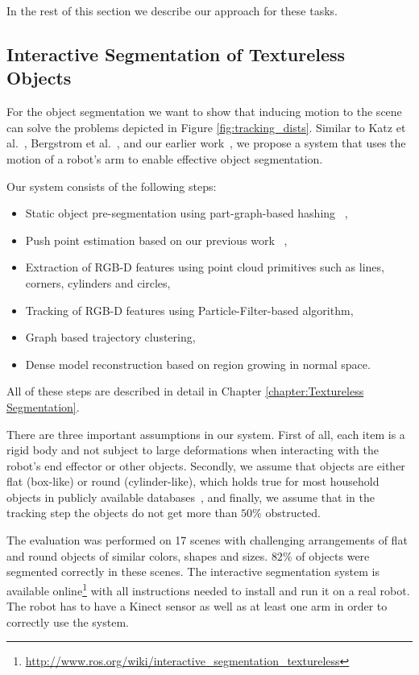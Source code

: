 In the rest of this section we describe our approach for these tasks.

\subsection{Interactive Segmentation of Textureless Objects} 


For the object segmentation 
 we want to show that inducing motion to the scene can solve the problems depicted in Figure \ref{fig:tracking_dists}. Similar  to Katz  et al.~\cite{Katz-WS-MM-ICRA2011}, Bergstrom et
al.~\cite{bergstrom11icvs}, and our earlier
work~\cite{bersch12interactive}, we propose a system that uses the
motion of a robot's arm to enable effective
object  segmentation.

Our system consists of the following steps:

\begin{itemize} 
\item Static object pre-segmentation using part-graph-based hashing ~\cite{marton12SC},
\item Push point estimation based on our previous work ~\cite{bersch12interactive},
\item Extraction of RGB-D features using point cloud primitives such as lines, corners, cylinders and circles,
\item Tracking of RGB-D features using Particle-Filter-based algorithm,
\item Graph based trajectory clustering,
\item Dense model reconstruction based on region growing in normal space.
\end{itemize} 


All of these steps are described in detail in Chapter \ref{chapter:Textureless Segmentation}. 


There are three important assumptions in our system. First of all, each item is a rigid  body and not subject
to large deformations when  interacting with  the robot's  end  effector or
other objects. Secondly, we assume that objects are either flat (box-like) or round (cylinder-like),
which holds true for most household objects in publicly available databases~\cite{marton11ijrr}, and finally, we assume
that in the tracking step the objects do not get more than $50\%$ obstructed.

The evaluation was performed on 17 scenes with challenging arrangements of flat and
round objects of similar colors, shapes and sizes. $82\%$ of objects
were segmented correctly in these scenes. The interactive segmentation system is available online\footnote{\url{http://www.ros.org/wiki/interactive_segmentation_textureless}} with all instructions needed to install and run it on a real robot. The robot has to have a Kinect sensor as well as at least one arm in order to correctly use the system.

